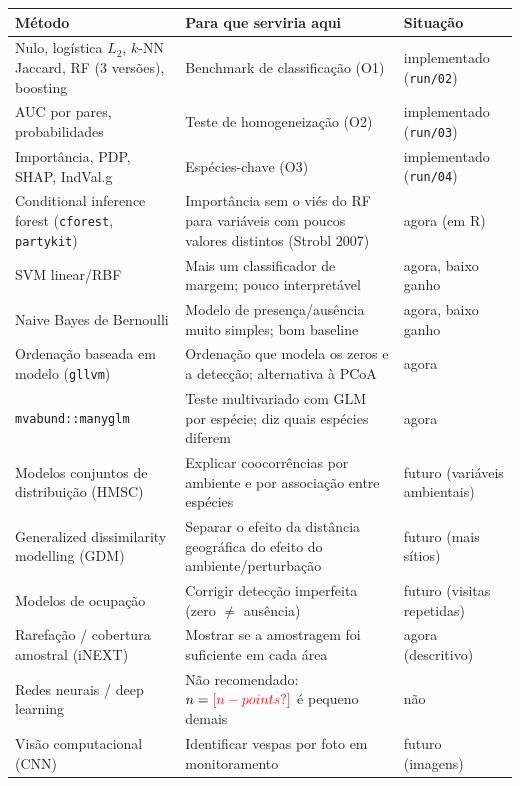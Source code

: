 \documentclass[11pt,a4paper]{article}
\makeatletter
\newcommand{\res}[1]{\ifcsname res@#1\endcsname\csname res@#1\endcsname\else\textcolor{red}{[#1?]}\fi}
\makeatother
\begin{document}
\begin{longtable}{>{\raggedright}p{3.6cm}>{\raggedright}p{6.8cm}>{\raggedright\arraybackslash}p{3.6cm}}
\toprule
Método & Para que serviria aqui & Situação\\
\midrule\endhead
Nulo, logística $L_2$, $k$-NN Jaccard, RF (3 versões), boosting & Benchmark de classificação (O1) & implementado (\texttt{run/02})\\
AUC por pares, probabilidades & Teste de homogeneização (O2) & implementado (\texttt{run/03})\\
Importância, PDP, SHAP, IndVal.g & Espécies-chave (O3) & implementado (\texttt{run/04})\\
Conditional inference forest (\texttt{cforest}, \texttt{partykit}) & Importância sem o viés do RF para variáveis com poucos valores distintos (Strobl 2007) & agora (em R)\\
SVM linear/RBF & Mais um classificador de margem; pouco interpretável & agora, baixo ganho\\
Naive Bayes de Bernoulli & Modelo de presença/ausência muito simples; bom baseline & agora, baixo ganho\\
Ordenação baseada em modelo (\texttt{gllvm}) & Ordenação que modela os zeros e a detecção; alternativa à PCoA & agora\\
\texttt{mvabund::manyglm} & Teste multivariado com GLM por espécie; diz quais espécies diferem & agora\\
Modelos conjuntos de distribuição (HMSC) & Explicar coocorrências por ambiente e por associação entre espécies & futuro (variáveis ambientais)\\
Generalized dissimilarity modelling (GDM) & Separar o efeito da distância geográfica do efeito do ambiente/perturbação & futuro (mais sítios)\\
Modelos de ocupação & Corrigir detecção imperfeita (zero $\neq$ ausência) & futuro (visitas repetidas)\\
Rarefação / cobertura amostral (iNEXT) & Mostrar se a amostragem foi suficiente em cada área & agora (descritivo)\\
Redes neurais / deep learning & Não recomendado: $n=\res{n-points}$ é pequeno demais & não\\
Visão computacional (CNN) & Identificar vespas por foto em monitoramento & futuro (imagens)\\
\bottomrule
\end{longtable}

\end{document}
